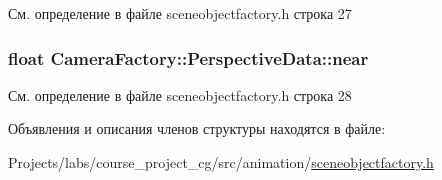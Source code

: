 См. определение в файле sceneobjectfactory.\+h строка 27

\subsubsection[{\texorpdfstring{near}{near}}]{\setlength{\rightskip}{0pt plus 5cm}float Camera\+Factory\+::\+Perspective\+Data\+::near}\hypertarget{struct_camera_factory_1_1_perspective_data_a2d3bcbd8b639a6ace7a79f91f0e71952}{}\label{struct_camera_factory_1_1_perspective_data_a2d3bcbd8b639a6ace7a79f91f0e71952}


См. определение в файле sceneobjectfactory.\+h строка 28



Объявления и описания членов структуры находятся в файле\+:\begin{DoxyCompactItemize}
\item 
Projects/labs/course\+\_\+project\+\_\+cg/src/animation/\hyperlink{sceneobjectfactory_8h}{sceneobjectfactory.\+h}\end{DoxyCompactItemize}
